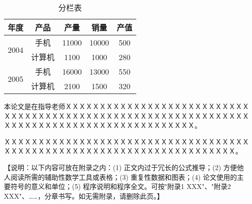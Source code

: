 \documentclass[a4paper]{ltxdoc}
\begin{document}
{\begin{table}[!htb]
\centering
\caption{分栏表}
\begin{tabular}{ccccc}
\hline
年度                    & 产品  & 产量    & 销量    & 产值  \\ \hline
\multirow{2}{*}{2004} & 手机  & 11000 & 10000 & 500 \\
                      & 计算机 & 1100  & 1000  & 280 \\ \hline
\multirow{2}{*}{2005} & 手机  & 16000 & 13000 & 550 \\
                      & 计算机 & 2100  & 1500  & 320 \\ \hline
\end{tabular}
\end{table}
}

{
\clearpage %
\nocite{*} %
}

\begin{acknowledge}
本论文是在指导老师ＸＸＸＸＸＸＸＸＸＸＸＸＸＸＸＸＸＸＸＸＸＸＸＸＸＸＸＸＸＸＸＸＸＸＸＸＸＸＸＸＸＸＸＸＸＸＸＸＸＸＸＸＸＸＸＸＸＸＸＸＸＸＸＸＸＸＸＸＸＸＸＸＸＸＸＸＸＸＸＸＸＸＸＸＸＸＸＸＸＸＸ。

ＸＸＸＸＸＸＸＸＸＸＸＸＸＸＸＸＸＸＸＸＸＸＸＸＸＸＸＸＸＸＸＸＸＸＸＸＸＸＸＸＸＸＸＸＸＸＸＸＸＸＸＸＸＸＸＸＸＸＸＸＸＸＸＸＸＸＸＸＸＸ。
\end{acknowledge}

\begin{appendix}
【说明：以下内容可放在附录之内：(1) 正文内过于冗长的公式推导；(2) 方便他人阅读所需的辅助性数学工具或表格；(3) 重复性数据和图表；(4) 论文使用的主要符号的意义和单位；(5) 程序说明和程序全文。可按"附录1  XXX"、"附录2  XXX"、……，分章书写。如无需附录，请删除此页。】
\end{appendix}
\end{document}
